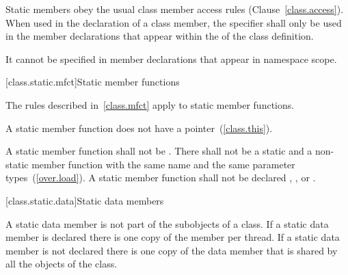 \pnum
Static members obey the usual class member access rules
(Clause~\ref{class.access}). When used in the declaration of a class
member, the  specifier shall only be used in the member
declarations that appear within the  of
the class definition.
\begin{note}
It cannot be specified in member declarations that appear in namespace scope.
\end{note}

[class.static.mfct]{Static member functions}
%

\pnum
\begin{note}
The rules described in~\ref{class.mfct} apply to static member
functions.
\end{note}

\pnum
\begin{note}
A static member function does not have a 
pointer~(\ref{class.this}).
\end{note}
A static member function shall not be . There
shall not be a static and a non-static member function with the
same name and the same parameter types~(\ref{over.load}). A
static member function shall not be declared ,
, or .

[class.static.data]{Static data members}
%

\pnum
A static data member is not part of the subobjects of a class. If a
static data member is declared  there is one copy of
the member per thread. If a static data member is not declared
 there is one copy of the data member that is shared by all
the objects of the class.

